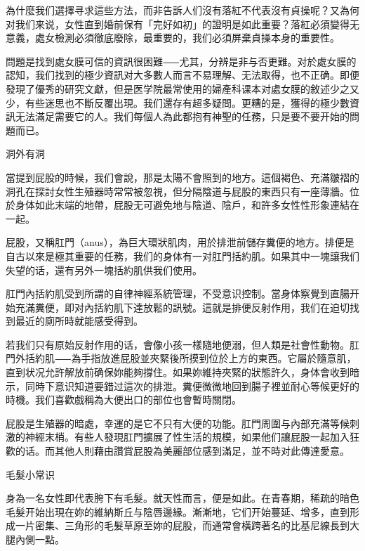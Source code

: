 \documentclass[12pt,UTF8]{ctexbook}
\begin{document}
為什麼我们選擇寻求這些方法，而非告訴人们沒有落紅不代表沒有貞操呢？又為何对我们来说，女性直到婚前保有「完好如初」的證明是如此重要？落紅必須變得无意義，處女檢測必須徹底廢除，最重要的，我们必須屏棄貞操本身的重要性。

問題是找到處女膜可信的資訊很困難⸺尤其，分辨是非与否更難。对於處女膜的認知，我们找到的極少資訊对大多數人而言不易理解、无法取得，也不正确。即便發現了優秀的研究文獻，但是医学院最常使用的婦產科课本对處女膜的敘述少之又少，有些迷思也不斷反覆出現。我们還存有超多疑問。更糟的是，獲得的極少數資訊无法滿足需要它的人。我们每個人為此都抱有神聖的任務，只是要不要开始的問題而已。





洞外有洞




當提到屁股的時候，我们會說，那是太陽不會照到的地方。這個褐色、充滿皺褶的洞孔在探討女性生殖器時常常被忽視，但分隔陰道与屁股的東西只有一座薄牆。位於身体如此末端的地帶，屁股无可避免地与陰道、陰戶，和許多女性性形象連結在一起。

屁股，又稱肛門（anus），為巨大環狀肌肉，用於排泄前儲存糞便的地方。排便是自古以來是極其重要的任務，我们的身体有一对肛門括約肌。如果其中一塊讓我们失望的话，還有另外一塊括約肌供我们使用。

肛門內括約肌受到所謂的自律神經系統管理，不受意识控制。當身体察覺到直腸开始充滿糞便，即对內括約肌下達放鬆的訊號。這就是排便反射作用，我们在迫切找到最近的廁所時就能感受得到。

若我们只有原始反射作用的话，會像小孩一樣隨地便溺，但人類是社會性動物。肛門外括約肌⸺為手指放進屁股並夾緊後所摸到位於上方的東西。它屬於隨意肌，直到状况允許解放前确保妳能夠撐住。如果妳維持夾緊的狀態許久，身体會收到暗示，同時下意识知道要錯过這次的排泄。糞便微微地回到腸子裡並耐心等候更好的時機。我们喜歡戲稱為大便出口的部位也會暫時關閉。

屁股是生殖器的暗處，幸運的是它不只有大便的功能。肛門周圍与內部充滿等候刺激的神經末梢。有些人發現肛門擴展了性生活的規模，如果他们讓屁股一起加入狂歡的话。而其他人則藉由讚賞屁股為美麗部位感到滿足，並不時对此傳達愛意。





毛髮小常识




身為一名女性即代表胯下有毛髮。就天性而言，便是如此。在青春期，稀疏的暗色毛髮开始出現在妳的維納斯丘与陰唇邊緣。漸漸地，它们开始蔓延、增多，直到形成一片密集、三角形的毛髮草原至妳的屁股，而通常會橫跨著名的比基尼線長到大腿內側一點。
\end{document}
